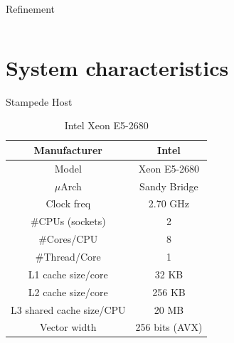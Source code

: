 \documentclass{beamer}
\begin{document}
\begin{frame}{Refinement}
\begin{columns}[c]
  \end{columns}

\end{frame}




\section{System characteristics}

\begin{frame}{Stampede Host}
\begin{table}[H]
\centering
\footnotesize
\begin{tabular}{| c | c |}\hline
Manufacturer & Intel\\ \hline
Model & Xeon E5-2680\\ \hline
$\mu$Arch & Sandy Bridge\\ \hline
Clock freq & 2.70 GHz\\ \hline
\#CPUs (sockets) & 2 \\ \hline
\#Cores/CPU & 8\\ \hline
\#Thread/Core & 1\\ \hline
L1 cache size/core & 32 KB\\ \hline
L2 cache size/core & 256 KB\\ \hline
L3 shared cache size/CPU & 20 MB\\ \hline
Vector width & 256 bits (AVX)\\ \hline
\end{tabular}
\caption{Intel Xeon E5-2680}
\end{table}
\end{frame}

\end{document}
